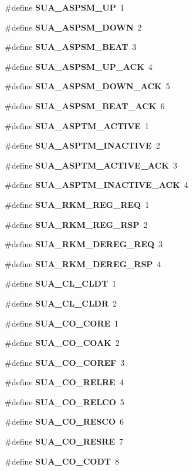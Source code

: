 \begin{DoxyCompactItemize}
\#define {\bf S\+U\+A\+\_\+\+A\+S\+P\+S\+M\+\_\+\+UP}~1
\item 
\#define {\bf S\+U\+A\+\_\+\+A\+S\+P\+S\+M\+\_\+\+D\+O\+WN}~2
\item 
\#define {\bf S\+U\+A\+\_\+\+A\+S\+P\+S\+M\+\_\+\+B\+E\+AT}~3
\item 
\#define {\bf S\+U\+A\+\_\+\+A\+S\+P\+S\+M\+\_\+\+U\+P\+\_\+\+A\+CK}~4
\item 
\#define {\bf S\+U\+A\+\_\+\+A\+S\+P\+S\+M\+\_\+\+D\+O\+W\+N\+\_\+\+A\+CK}~5
\item 
\#define {\bf S\+U\+A\+\_\+\+A\+S\+P\+S\+M\+\_\+\+B\+E\+A\+T\+\_\+\+A\+CK}~6
\item 
\#define {\bf S\+U\+A\+\_\+\+A\+S\+P\+T\+M\+\_\+\+A\+C\+T\+I\+VE}~1
\item 
\#define {\bf S\+U\+A\+\_\+\+A\+S\+P\+T\+M\+\_\+\+I\+N\+A\+C\+T\+I\+VE}~2
\item 
\#define {\bf S\+U\+A\+\_\+\+A\+S\+P\+T\+M\+\_\+\+A\+C\+T\+I\+V\+E\+\_\+\+A\+CK}~3
\item 
\#define {\bf S\+U\+A\+\_\+\+A\+S\+P\+T\+M\+\_\+\+I\+N\+A\+C\+T\+I\+V\+E\+\_\+\+A\+CK}~4
\item 
\#define {\bf S\+U\+A\+\_\+\+R\+K\+M\+\_\+\+R\+E\+G\+\_\+\+R\+EQ}~1
\item 
\#define {\bf S\+U\+A\+\_\+\+R\+K\+M\+\_\+\+R\+E\+G\+\_\+\+R\+SP}~2
\item 
\#define {\bf S\+U\+A\+\_\+\+R\+K\+M\+\_\+\+D\+E\+R\+E\+G\+\_\+\+R\+EQ}~3
\item 
\#define {\bf S\+U\+A\+\_\+\+R\+K\+M\+\_\+\+D\+E\+R\+E\+G\+\_\+\+R\+SP}~4
\item 
\#define {\bf S\+U\+A\+\_\+\+C\+L\+\_\+\+C\+L\+DT}~1
\item 
\#define {\bf S\+U\+A\+\_\+\+C\+L\+\_\+\+C\+L\+DR}~2
\item 
\#define {\bf S\+U\+A\+\_\+\+C\+O\+\_\+\+C\+O\+RE}~1
\item 
\#define {\bf S\+U\+A\+\_\+\+C\+O\+\_\+\+C\+O\+AK}~2
\item 
\#define {\bf S\+U\+A\+\_\+\+C\+O\+\_\+\+C\+O\+R\+EF}~3
\item 
\#define {\bf S\+U\+A\+\_\+\+C\+O\+\_\+\+R\+E\+L\+RE}~4
\item 
\#define {\bf S\+U\+A\+\_\+\+C\+O\+\_\+\+R\+E\+L\+CO}~5
\item 
\#define {\bf S\+U\+A\+\_\+\+C\+O\+\_\+\+R\+E\+S\+CO}~6
\item 
\#define {\bf S\+U\+A\+\_\+\+C\+O\+\_\+\+R\+E\+S\+RE}~7
\item 
\#define {\bf S\+U\+A\+\_\+\+C\+O\+\_\+\+C\+O\+DT}~8

\end{DoxyCompactItemize}
